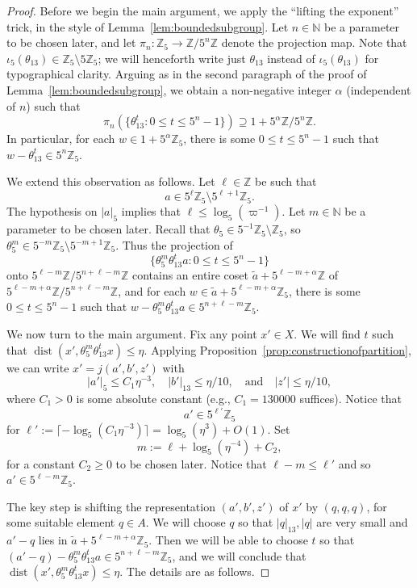 \documentclass[11pt]{amsart}
\theoremstyle{definition}
\newcommand{\N}{{\mathbb N}}
\newcommand{\Z}{{\mathbb Z}}
\DeclareMathOperator{\dist}{dist}
\begin{document}
\begin{proof}
Before we begin the main argument, we apply the ``lifting the exponent'' trick, in the style of Lemma~\ref{lem:boundedsubgroup}.  Let $n \in \N$ be a parameter to be chosen later, and let $\pi_n: \mathbb{Z}_5 \to \mathbb{Z}/5^n \mathbb{Z}$ denote the projection map.  Note that $\iota_5(\theta_{13}) \in \mathbb{Z}_5 \setminus 5\mathbb{Z}_5$; we will henceforth write just $\theta_{13}$ instead of $\iota_5(\theta_{13})$ for typographical clarity.  Arguing as in the second paragraph of the proof of Lemma~\ref{lem:boundedsubgroup}, we obtain a non-negative integer $\alpha$ (independent of $n$) such that
$$\pi_n(\{\theta_{13}^t: 0 \leq t \leq 5^n-1\}) \supseteq 1+5^\alpha \mathbb{Z}/5^n \Z.$$
In particular, for each $w \in 1+5^{\alpha} \mathbb{Z}_5$, there is some $0 \leq t \leq 5^n-1$ such that $w-\theta_{13}^t \in 5^n \mathbb{Z}_5$.

We extend this observation as follows.  Let $\ell \in \mathbb{Z}$ be such that $$a \in 5^\ell \Z_5 \setminus 5^{\ell+1}\Z_5.$$  The hypothesis on $|a|_5$ implies that $\ell \leq \log_5(\varpi^{-1})$.
Let $m \in \mathbb{N}$ be a parameter to be chosen later.  Recall that $\theta_5 \in 5^{-1}\Z_5 \setminus \Z_5$, so $\theta_5^m \in 5^{-m}\Z_5 \setminus 5^{-m+1}\Z_5$.  Thus the projection of
$$\{\theta_5^m \theta_{13}^t a: 0 \leq t \leq 5^n-1\}$$
onto $5^{\ell-m}\Z/ 5^{n+\ell-m}\Z$ contains an entire coset $\widetilde{a}+5^{\ell-m+\alpha}\Z$ of $5^{\ell-m+\alpha}\Z / 5^{n+\ell-m}\Z$, and for each $w \in \widetilde{a}+5^{\ell-m+\alpha}\Z_5$, there is some $0 \leq t \leq 5^n-1$ such that $w-\theta_5^m \theta_{13}^t a \in 5^{n+\ell-m} \mathbb{Z}_5$.

We now turn to the main argument.  Fix any point $x' \in X$.  We will find $t$ such that $\dist(x',\theta_5^m \theta_{13}^t x) \leq \eta$.  Applying Proposition~\ref{prop:constructionofpartition}, we can write $x'=j(a',b',z')$ with
$$|a'|_5 \leq C_1 \eta^{-3}, \quad |b'|_{13} \leq \eta/10, \quad \text{and} \quad |z'| \leq \eta/10,$$
where $C_1>0$ is some absolute constant (e.g., $C_1=130000$ suffices).  
Notice that
$$a' \in 5^{\ell'}\mathbb{Z}_5$$
for $\ell':=\lceil -\log_5(C_1 \eta^{-3})\rceil=\log_5(\eta^3)+O(1)$.  Set
$$m:=\ell+\log_5(\eta^{-4})+C_2,$$
for a constant $C_2 \geq 0$ to be chosen later.  Notice that $\ell-m \leq \ell'$ and so $a' \in 5^{\ell-m}\Z_5$.


The key step is shifting the representation $(a',b',z')$ of $x'$ by $(q,q,q)$, for some suitable element $q \in A$.  We will choose $q$ so that $|q|_{13}, |q|$ are very small and $a'-q$ lies in $\widetilde{a}+5^{\ell-m+\alpha}\Z_5$.  Then we will be able to choose $t$ so that $(a'-q)-\theta_5^m \theta_{13}^t a \in 5^{n+\ell-m} \mathbb{Z}_5$, and we will conclude that $\dist(x',\theta_5^m \theta_{13}^t x) \leq \eta$.  The details are as follows.


\end{proof}
\end{document}
